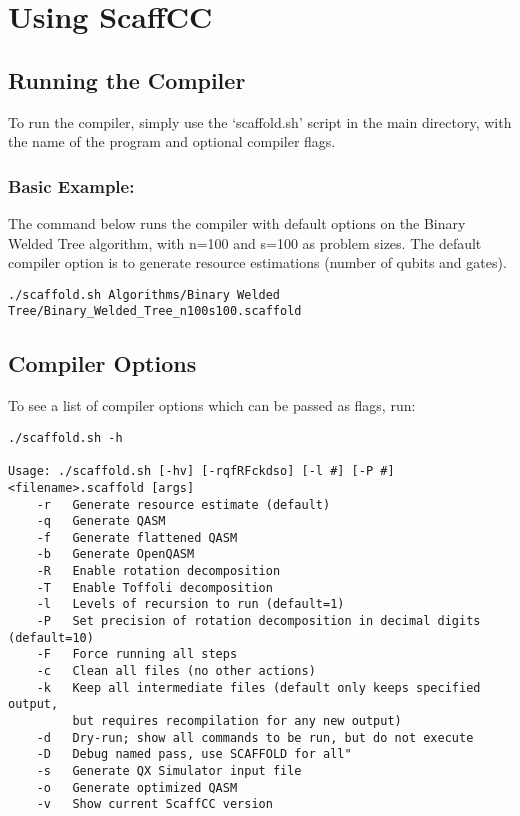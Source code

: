 \chapter{Using ScaffCC}\label{ch:usage}

\section{Running the Compiler}
To run the compiler, simply use the `scaffold.sh' script in the main directory, with the name of the program and optional compiler flags.

\subsection{Basic Example:}

The command below runs the compiler with default options on the Binary Welded Tree algorithm, with n=100 and s=100 as problem sizes.
The default compiler option is to generate resource estimations (number of qubits and gates).

\begin{lstlisting}
./scaffold.sh Algorithms/Binary Welded Tree/Binary_Welded_Tree_n100s100.scaffold
\end{lstlisting}


\section{Compiler Options}
To see a list of compiler options which can be passed as flags, run:

\begin{lstlisting}
./scaffold.sh -h

Usage: ./scaffold.sh [-hv] [-rqfRFckdso] [-l #] [-P #] <filename>.scaffold [args]
    -r   Generate resource estimate (default)
    -q   Generate QASM
    -f   Generate flattened QASM
    -b   Generate OpenQASM
    -R   Enable rotation decomposition
    -T   Enable Toffoli decomposition
    -l   Levels of recursion to run (default=1)
    -P   Set precision of rotation decomposition in decimal digits (default=10)
    -F   Force running all steps
    -c   Clean all files (no other actions)
    -k   Keep all intermediate files (default only keeps specified output,
         but requires recompilation for any new output)
    -d   Dry-run; show all commands to be run, but do not execute
    -D   Debug named pass, use SCAFFOLD for all"
    -s   Generate QX Simulator input file 
    -o   Generate optimized QASM
    -v   Show current ScaffCC version
\end{lstlisting}

